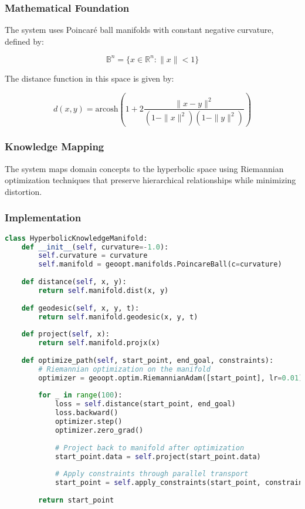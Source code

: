 \documentclass[journal,onecolumn]{IEEEtran}
\begin{document}
\subsubsection{Mathematical Foundation}

The system uses Poincaré ball manifolds with constant negative curvature, defined by:

\begin{equation}
\mathbb{B}^n = \{x \in \mathbb{R}^n : \|x\| < 1\}
\end{equation}

The distance function in this space is given by:

\begin{equation}
d(x, y) = \text{arcosh}\left(1 + 2\frac{\|x-y\|^2}{(1-\|x\|^2)(1-\|y\|^2)}\right)
\end{equation}

\subsubsection{Knowledge Mapping}

The system maps domain concepts to the hyperbolic space using Riemannian optimization techniques that preserve hierarchical relationships while minimizing distortion.

\subsubsection{Implementation}

\begin{lstlisting}[language=Python, caption=NEMO Implementation Pseudocode]
class HyperbolicKnowledgeManifold:
    def __init__(self, curvature=-1.0):
        self.curvature = curvature
        self.manifold = geoopt.manifolds.PoincareBall(c=curvature)
    
    def distance(self, x, y):
        return self.manifold.dist(x, y)
    
    def geodesic(self, x, y, t):
        return self.manifold.geodesic(x, y, t)
    
    def project(self, x):
        return self.manifold.projx(x)
    
    def optimize_path(self, start_point, end_goal, constraints):
        # Riemannian optimization on the manifold
        optimizer = geoopt.optim.RiemannianAdam([start_point], lr=0.01)
        
        for _ in range(100):
            loss = self.distance(start_point, end_goal)
            loss.backward()
            optimizer.step()
            optimizer.zero_grad()
            
            # Project back to manifold after optimization
            start_point.data = self.project(start_point.data)
            
            # Apply constraints through parallel transport
            start_point = self.apply_constraints(start_point, constraints)
        
        return start_point
\end{lstlisting}
\end{document}
